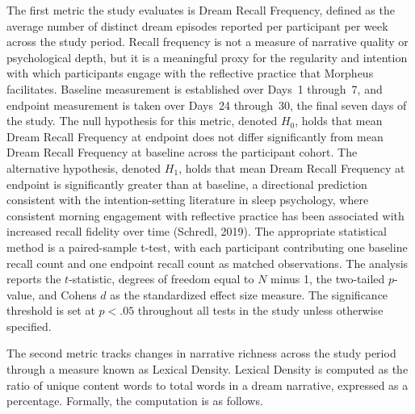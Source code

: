 \documentclass[12pt,a4paper]{report}
\begin{document}
The first metric the study evaluates is Dream Recall Frequency, defined as the average number of distinct dream episodes reported per participant per week across the study period. Recall frequency is not a measure of narrative quality or psychological depth, but it is a meaningful proxy for the regularity and intention with which participants engage with the reflective practice that Morpheus facilitates. Baseline measurement is established over Days~\num{1} through~\num{7}, and endpoint measurement is taken over Days~\num{24} through~\num{30}, the final seven days of the study. The null hypothesis for this metric, denoted $H_0$, holds that mean Dream Recall Frequency at endpoint does not differ significantly from mean Dream Recall Frequency at baseline across the participant cohort. The alternative hypothesis, denoted $H_1$, holds that mean Dream Recall Frequency at endpoint is significantly greater than at baseline, a directional prediction consistent with the intention-setting literature in sleep psychology, where consistent morning engagement with reflective practice has been associated with increased recall fidelity over time (Schredl, 2019). The appropriate statistical method is a paired-sample t-test, with each participant contributing one baseline recall count and one endpoint recall count as matched observations. The analysis reports the $t$-statistic, degrees of freedom equal to $N$ minus \num{1}, the two-tailed $p$-value, and Cohen\textquotesingle{}s $d$ as the standardized effect size measure. The significance threshold is set at $p < .05$ throughout all tests in the study unless otherwise specified.

The second metric tracks changes in narrative richness across the study period through a measure known as Lexical Density. Lexical Density is computed as the ratio of unique content words to total words in a dream narrative, expressed as a percentage. Formally, the computation is as follows.
\end{document}
